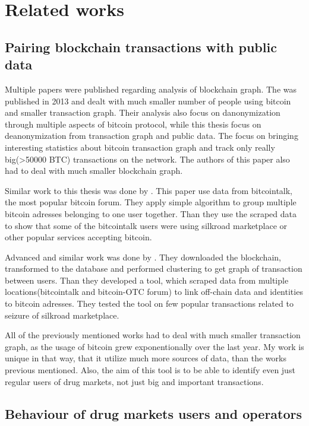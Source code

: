 \documentclass[
  digital, %
  table,   %
  lof,     %
  lot,     %
  oneside
]{fithesis3}
\begin{document}
\chapter{Related works}
\section{Pairing blockchain transactions with public data}
Multiple papers were published regarding analysis of blockchain graph. The \parencite{reid2013analysis} was published in 2013 and dealt with much smaller number of people using bitcoin and smaller transaction graph.
Their analysis also focus on danonymization through multiple aspects of bitcoin protocol, while this thesis focus on deanonymization from transaction graph and public data.
The \parencite{ron2013quantitative} focus on bringing interesting statistics about bitcoin transaction graph and track only really big(>50000 BTC)
transactions on the network. The authors of this paper also had to deal with much smaller blockchain graph.

Similar work to this thesis was done by \parencite{fleder2015bitcoin}. This paper use data from bitcointalk, the most popular bitcoin forum. 
They apply simple algorithm to group multiple bitcoin adresses belonging to one user together. Than they use the scraped data to show
that some of the bitcointalk users were using silkroad marketplace or other popular services accepting bitcoin.

Advanced and similar work was done by \parencite{spagnuolo2014bitiodine}. They downloaded the blockchain, transformed to the database
and performed clustering to get graph of transaction between users.
Than they developed a tool, which scraped data from multiple locations(bitcointalk and bitcoin-OTC forum) to link off-chain data and identities to bitcoin adresses.
They tested the tool on few popular transactions related to seizure of silkroad marketplace.

All of the previously mentioned works had to deal with much smaller transaction graph, as the usage of bitcoin grew exponentionally over the last year. 
My work is unique in that way, that it utilize much more sources of data, than the works previous mentioned. Also, the aim of this tool is to be able
to identify even just regular users of drug markets, not just big and important transactions.

\section{Behaviour of drug markets users and operators}
\end{document}
